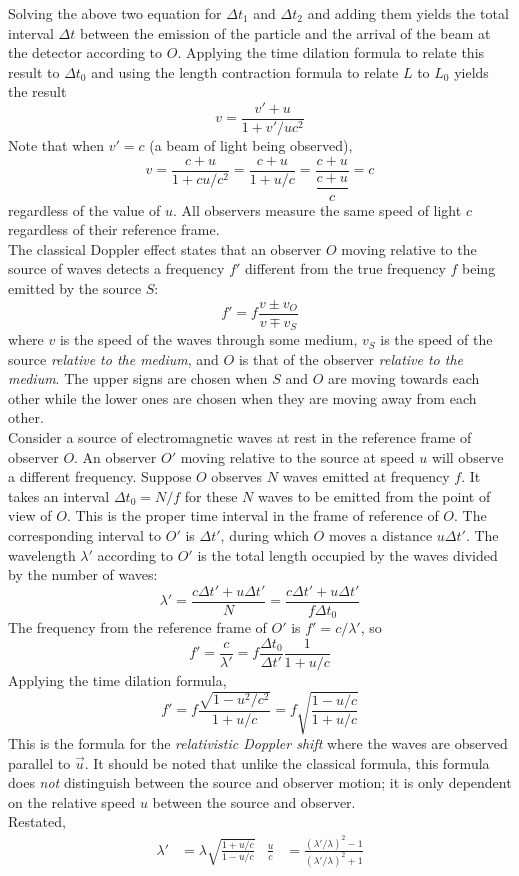 \documentclass{subfiles}
\begin{document}
				Solving the above two equation for \(\Delta t_1\) and \(\Delta t_2\) and adding them yields the total interval \(\Delta t\) between the emission of the particle and the arrival of the beam at the detector according to \(O\). Applying the time dilation formula to relate this result to \(\Delta t_0\) and using the length contraction formula to relate \(L\) to \(L_0\) yields the result
				\[v = \frac{v' + u}{1 + v'/uc^2} \tag{relativistic velocity addition}\]
				Note that when \(v' = c\) (a beam of light being observed),
				\[
					v = \frac{c + u}{1 + cu/c^2}
							= \frac{c + u}{1 + u/c}
							= \frac{c + u}{\dfrac{c + u}{c}}
							= c
				\]
				regardless of the value of \(u\). All observers measure the same speed of light \(c\) regardless of their reference frame. \\
			The classical Doppler effect states that an observer \(O\) moving relative to the source of waves detects a frequency \(f'\) different from the true frequency \(f\) being emitted by the source \(S\):
				\[f' = f\frac{v \pm v_O}{v \mp v_S} \tag{classical Doppler effect}\]
				where \(v\) is the speed of the waves through some medium, \(v_S\) is the speed of the source \textit{relative to the medium}, and \(O\) is that of the observer \textit{relative to the medium}. The upper signs are chosen when \(S\) and \(O\) are moving towards each other while the lower ones are chosen when they are moving away from each other. \\
			Consider a source of electromagnetic waves at rest in the reference frame of observer \(O\). An observer \(O'\) moving relative to the source at speed \(u\) will observe a different frequency. Suppose \(O\) observes \(N\) waves emitted at frequency \(f\). It takes an interval \(\Delta t_0 = N/f\) for these \(N\) waves to be emitted from the point of view of \(O\). This is the proper time interval in the frame of reference of \(O\). The corresponding interval to \(O'\) is \(\Delta t'\), during which \(O\) moves a distance \(u\Delta t'\). The wavelength \(\lambda'\) according to \(O'\) is the total length occupied by the waves divided by the number of waves:
				\[
					\lambda' = \frac{c\Delta t' + u\Delta t'}{N}
						= \frac{c\Delta t' + u\Delta t'}{f\Delta t_0}
				\]
				The frequency from the reference frame of \(O'\) is \(f' = c/\lambda'\), so
				\[
					f' = \frac{c}{\lambda'}
						= f\frac{\Delta t_0}{\Delta t'}\frac{1}{1 + u/c}
				\]
				Applying the time dilation formula,
				\[
					f' = f\frac{\sqrt{1 - u^2/c^2}}{1 + u/c}
						= f\sqrt{\frac{1 - u/c}{1 + u/c}} \tag{relativistic Doppler shift}
				\]
				This is the formula for the \textit{relativistic Doppler shift} where the waves are observed parallel to \(\vec{u}\). It should be noted that unlike the classical formula, this formula does \textit{not} distinguish between the source and observer motion; it is only dependent on the relative speed \(u\) between the source and observer. \\
				Restated,
				\begin{align*}
					\lambda' &= \lambda\sqrt{\frac{1 + u/c}{1 - u/c}} &
						\frac{u}{c} &= \frac{(\lambda'/\lambda)^2 - 1}{(\lambda'/\lambda)^2 + 1}	
				\end{align*}
\end{document}
